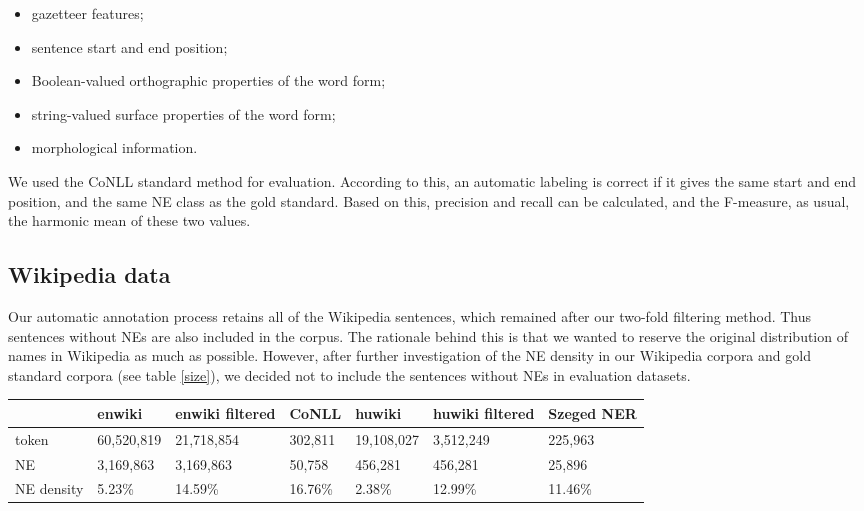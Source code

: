 \documentclass[11pt]{article}
\begin{document}
\begin{itemize}
\item gazetteer features;
\item sentence start and end position;
\item Boolean-valued orthographic properties of the word form;
\item string-valued surface properties of the word form;
\item morphological information.
\end{itemize}

We used the CoNLL standard method for evaluation. According to this, an automatic labeling is correct if it gives the same start and end position, and the same NE class as the gold standard. Based on this, precision and recall can be calculated, and the F-measure, as usual, the harmonic mean of these two values.  

\subsection{Wikipedia data}

Our automatic annotation process retains all of the Wikipedia sentences, which remained after our two-fold filtering method. Thus sentences without NEs are also included in the corpus. The rationale behind this is that we wanted to reserve the original distribution of names in Wikipedia as much as possible. However, after further investigation of the NE density in our Wikipedia corpora and gold standard corpora (see table \ref{size}), we decided not to include the sentences without NEs in evaluation datasets. 

\begin{table*}[ht]
\begin{center}
\begin{tabular}{lllllll}
\hline  & \bf enwiki & \bf enwiki filtered & \bf CoNLL & \bf huwiki & \bf huwiki filtered  & \bf Szeged NER \\ \hline
token & 60,520,819 & 21,718,854 & 302,811 &  19,108,027 & 3,512,249  & 225,963\\
NE & 3,169,863 & 3,169,863 & 50,758 & 456,281 & 456,281  & 25,896\\
NE density & 5.23\% & 14.59\% & 16.76\% & 2.38\% & 12.99\%  & 11.46\%\\
\hline
\end{tabular}
\end{center}
\caption{\label{size} Corpus size and NE-density.}
\end{table*}
\end{document}
